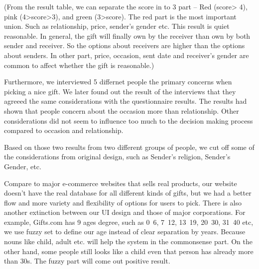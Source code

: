 \documentclass[11pt,twocolumn]{article}
\begin{document}
(From the result table, we can separate the score in to 3 part – Red (score> 4), pink (4>score>3), and green (3>score).  The red part is the most important union.  Such as relationship, price, sender’s gender etc. This result is quiet reasonable.   In general, the gift will finally own by the receiver than own by both sender and receiver.   So the options about receivers are higher than the options about senders.  In other part, price, occasion, sent date and receiver’s gender are common to affect whether the gift is reasonable.)

Furthermore, we interviewed 5 differnet people the primary concerns when picking a nice gift. We later found out the result of the interviews that they agreeed the same considerations with the questionnaire results. The results had shown that people  concern about the occasion more than relationship.  Other considerations did not seem to influence too much to the decision making process compared to occasion and relationship.

Based on those two results from two different groups of people, we cut off some of the considerations from original design, such as Sender's religion, Sender's Gender, etc.




Compare to major e-commerce websites that sells real products, our website doesn't have the real database for all different kinds of gifts, but we had a better flow and more variety and flexibility of options for users to pick. There is also another extinction between our UI design and those of major corporations. For example, Gifts.com has 9 ages degree, such as 0~6, 7~12, 13~19, 20~30, 31~40 etc, we use fuzzy set to define our age instead of clear separation by years. Because nouns like child, adult etc. will help the system in the commonsense part.  On the other hand, some people still looks like a child even that person has already more than 30s.  The fuzzy part will come out positive result.
\end{document}
